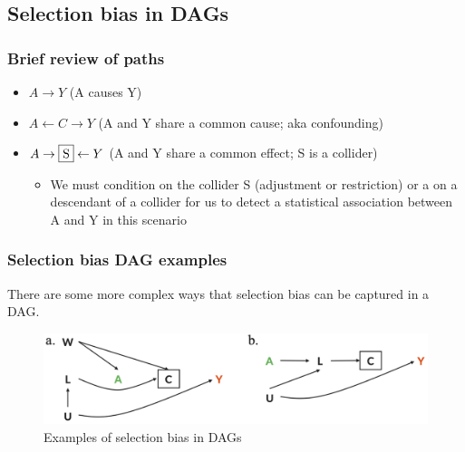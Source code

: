 \documentclass[
]{book}
\providecommand{\tightlist}{%
  \setlength{\itemsep}{0pt}\setlength{\parskip}{0pt}}
\begin{document}
\hypertarget{selection-bias-in-dags}{%
\subsection{Selection bias in DAGs}\label{selection-bias-in-dags}}

\hypertarget{brief-review-of-paths}{%
\subsubsection{Brief review of paths}\label{brief-review-of-paths}}

\begin{itemize}
\tightlist
\item
  \(A \rightarrow Y\) (A causes Y)
\item
  \(A \leftarrow C \rightarrow Y\) (A and Y share a common cause; aka confounding)
\item
  \(A \rightarrow \fbox{S} \leftarrow Y\) (A and Y share a common effect; S is a collider)

  \begin{itemize}
  \tightlist
  \item
    We must condition on the collider S (adjustment or restriction) or a on a descendant of a collider for us to detect a statistical association between A and Y in this scenario
  \end{itemize}
\end{itemize}

\hypertarget{selection-bias-dag-examples}{%
\subsubsection{Selection bias DAG examples}\label{selection-bias-dag-examples}}

There are some more complex ways that selection bias can be captured in a DAG.

\begin{figure}

{\centering \includegraphics[width=1\linewidth]{img/selection-bias/selection_bias_examples} 

}

\caption{Examples of selection bias in DAGs}\label{fig:unnamed-chunk-21}
\end{figure}
\end{document}
